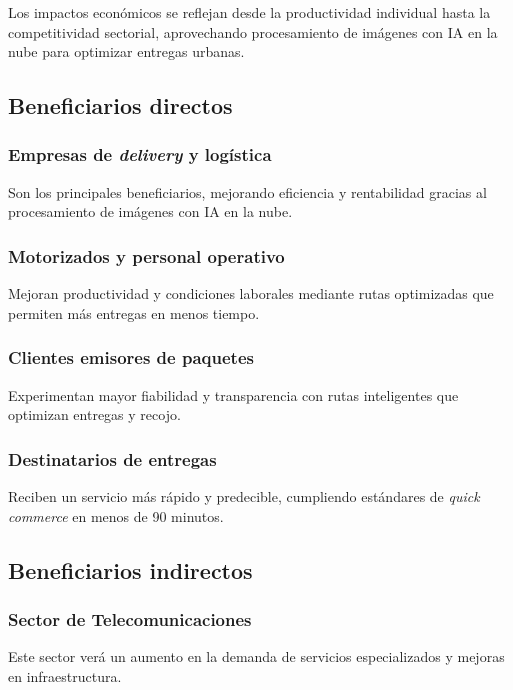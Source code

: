 Los impactos económicos se reflejan desde la productividad individual hasta la competitividad sectorial, aprovechando procesamiento de imágenes con IA en la nube para optimizar entregas urbanas.

\subsection{Beneficiarios directos}

\subsubsection{Empresas de \textit{delivery} y logística}

Son los principales beneficiarios, mejorando eficiencia y rentabilidad gracias al procesamiento de imágenes con IA en la nube.

\subsubsection{Motorizados y personal operativo}

Mejoran productividad y condiciones laborales mediante rutas optimizadas que permiten más entregas en menos tiempo.

\subsubsection{Clientes emisores de paquetes}

Experimentan mayor fiabilidad y transparencia con rutas inteligentes que optimizan entregas y recojo.

\subsubsection{Destinatarios de entregas}

Reciben un servicio más rápido y predecible, cumpliendo estándares de \textit{quick commerce} en menos de 90 minutos.

\subsection{Beneficiarios indirectos}

\subsubsection{Sector de Telecomunicaciones}

Este sector verá un aumento en la demanda de servicios especializados y mejoras en infraestructura.

